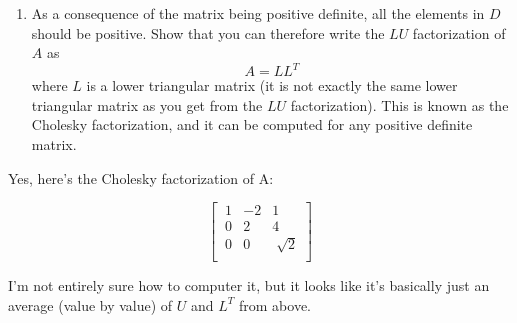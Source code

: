 \documentclass{article}
\begin{document}
\begin{enumerate}
\begin{enumerate}
\begin{mdframed}[style=MyFrame]
\end{mdframed}

\item As a consequence of the matrix being positive definite, all the elements in $D$ should be positive. Show that you can therefore write the $LU$ factorization of $A$ as
\begin{equation*}
A = LL^T
\end{equation*}
where $L$ is a lower triangular matrix (it is not exactly the same lower triangular matrix as you get from the $LU$ factorization). This is known as the Cholesky factorization, and it can be computed for any positive definite matrix.
\end{enumerate}

\begin{mdframed}[style=MyFrame]

Yes, here's the Cholesky factorization of A:

\begin{equation*}
\begin{bmatrix}
 ~1     &-2     &1 \\
    ~0     &2     &4 \\
     ~0     &0     &\sqrt[]{2} \\
\end{bmatrix}
\end{equation*}

I'm not entirely sure how to computer it, but it looks like it's basically just an average (value by value) of $U$ and $L^T$ from above.

\end{mdframed}

\end{enumerate}
\end{document}
